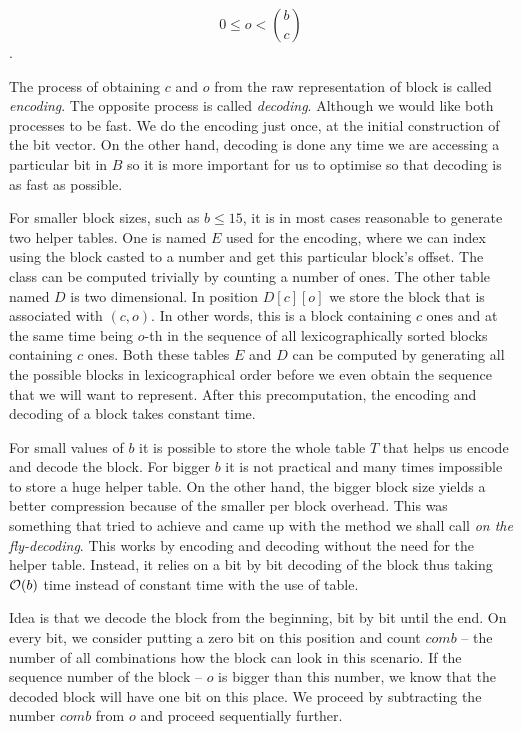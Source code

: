 				$$0 \leq o < {b\choose c}$$.

The process of obtaining $c$ and $o$ from the raw representation of block is called
\textit{encoding}. The opposite process is called \textit{decoding}. Although we would
like both processes to be fast. We do the encoding just once, at the initial construction
of the bit vector. On the other hand, decoding is done any time we are accessing a particular
bit in $B$ so it is more important for us to optimise so that decoding is as fast as possible.

For smaller block sizes, such as $b\leq 15$, it is in most cases reasonable to
generate two helper tables. One is named $E$ used for the encoding, where we can
index using the block casted to a number and get this particular block's offset.
The class can be computed trivially by counting a number of ones. The other table
named $D$ is two dimensional. In position $D[c][o]$ we store the block that
is associated with $(c, o)$. In other words, this is a block containing $c$ ones
and at the same time being $o$-th in the sequence of all lexicographically sorted
blocks containing $c$ ones. Both these tables $E$ and $D$ can be computed
by generating all the possible blocks in lexicographical order before we even
obtain the sequence that we will want to represent. After this precomputation,
the encoding and decoding of a block takes constant time.

For small values of $b$ it is possible to store the whole table $T$ that helps us
encode and decode the block. For bigger $b$ it is not practical and many times
impossible to store a huge helper table. On the other hand, the bigger block size
yields a better compression because of the smaller per block overhead. This was
something that \cite{navarro2012fast} tried to achieve and came up with the method
we shall call \textit{on the fly-decoding}. This works by encoding and decoding without
the need for the helper table. Instead, it relies on a bit by bit decoding of the block
thus taking $\mathcal{O}(b)$ time instead of constant time with the use of table.

Idea is that we decode the block from the beginning, bit by bit until the end. On every bit,
we consider putting a zero bit on this position and count $comb$ -- the number of all
combinations how the block can look in this scenario. If the sequence number of the block --
$o$ is bigger than this number, we know that the decoded block will have one bit on this place.
We proceed by subtracting the number $comb$ from $o$ and proceed sequentially further.

